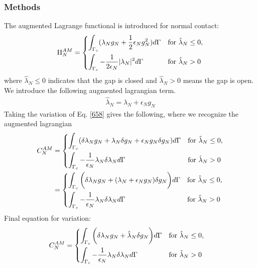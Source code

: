 \documentclass[12pt,3p]{article}
\numberwithin{equation}{section}
\begin{document}
\subsubsection{Methods}
The augmented Lagrange functional is introduced for normal contact: 
\begin{align}\label{658}
\Pi_{N}^{AM} = 
\begin{dcases}
    \int_{\Gamma_c} (\lambda_N g_N + \frac{1}{2} \epsilon_N g_N^2) d \Gamma & \text{for } \hat{\lambda}_N \leq 0, \\
    \int_{\Gamma_c} -\frac{1}{2 \epsilon_N} |\lambda_N|^2 d \Gamma               & \text{for } \hat{\lambda}_N > 0
\end{dcases}
\end{align}
where $ \hat{\lambda}_N \leq 0$ indicates that the gap is closed and $\hat{\lambda}_N > 0$ means the gap is open. We introduce the following augmented lagrangian term.
\begin{align*}
\hat{\lambda}_N = \lambda_N + \epsilon_N g_N
\end{align*}
Taking the variation of Eq. \ref{658} gives the following, where we recognize the augmented lagrangian 
\begin{align*}
C_{N}^{AM} &= 
\begin{dcases}
    \int_{\Gamma_c} (\delta \lambda_N g_N + \lambda_N \delta g_N + \epsilon_N g_N \delta g_N) d \Gamma & \text{for } \hat{\lambda}_N \leq 0, \\
    \int_{\Gamma_c} -\frac{1}{\epsilon_N} \lambda_N \delta \lambda_N d \Gamma               & \text{for } \hat{\lambda}_N > 0
\end{dcases} \\
&= 
\begin{dcases}
    \int_{\Gamma_c} \bigg( \delta \lambda_N g_N + (\lambda_N + \epsilon_N g_N) \delta g_N \bigg) d \Gamma & \text{for } \hat{\lambda}_N \leq 0, \\
    \int_{\Gamma_c} -\frac{1}{\epsilon_N} \lambda_N \delta \lambda_N d \Gamma               & \text{for } \hat{\lambda}_N > 0
\end{dcases} 
\end{align*}
Final equation for variation: 
\begin{align}\label{659}
C_{N}^{AM} &= 
\begin{dcases}
    \int_{\Gamma_c} \bigg( \delta \lambda_N g_N + \hat{\lambda}_N \delta g_N \bigg) d \Gamma & \text{for } \hat{\lambda}_N \leq 0, \\
    \int_{\Gamma_c} -\frac{1}{\epsilon_N} \lambda_N \delta \lambda_N d \Gamma               & \text{for } \hat{\lambda}_N > 0
\end{dcases}
\end{align}
\end{document}
